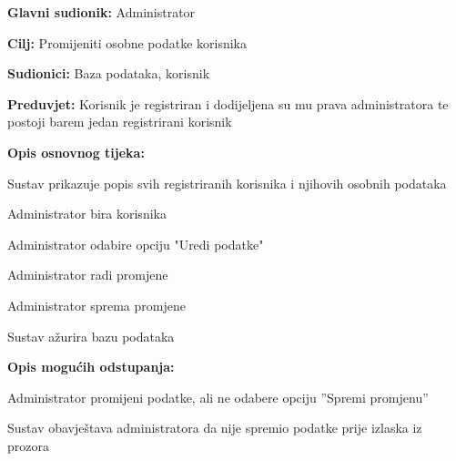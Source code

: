 					\noindent {}
					\begin{packed_item}
						
						\item \textbf{Glavni sudionik:} Administrator
						\item \textbf{Cilj:} Promijeniti osobne podatke korisnika
						\item \textbf{Sudionici:} Baza podataka, korisnik 
						\item \textbf{Preduvjet:} Korisnik je registriran i dodijeljena su mu prava administratora te postoji barem jedan registrirani korisnik
						\item \textbf{Opis osnovnog tijeka:}
						
						\item[] \begin{packed_enum}
							
							\item Sustav prikazuje popis svih registriranih korisnika i njihovih osobnih podataka
							\item Administrator bira korisnika
							\item Administrator odabire opciju "Uredi podatke"
							\item Administrator radi promjene
							\item Administrator sprema promjene 
							\item Sustav ažurira bazu podataka					
						\end{packed_enum}
						
						\item  \textbf{Opis mogućih odstupanja:}
						
						\item[] \begin{packed_item}
							
							\item[5.a] Administrator promijeni podatke, ali ne odabere opciju ”Spremi promjenu” 
							\item[] \begin{packed_enum}
								
								\item Sustav obavještava administratora da nije spremio podatke prije izlaska iz prozora
								
							\end{packed_enum}
							
						\end{packed_item}
					\end{packed_item}
					
